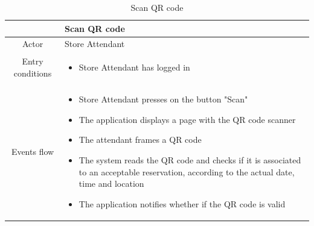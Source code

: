 \documentclass[table, 12pt]{article}
\begin{document}
\begin{longtable}{|c| p{10cm}|}
    \caption{Scan QR code}                                                                                                                                                                                                                                                                \\
    \hline
                     & Scan QR code                                                                                                                                                                                                                                                       \\
    \hline
    Actor            & Store Attendant                                                                                                                                                                                                                                                    \\
    \hline
    Entry conditions & \begin{itemize}
        \item Store Attendant has logged in
    \end{itemize}                                                                                                                                                                                                                                         \\
    \hline
    Events flow      & \begin{itemize}[nosep,after=\strut]
        \item Store Attendant presses on the button "Scan"
        \item The application displays a page with the QR code scanner
        \item The attendant frames a QR code
        \item The system reads the QR code and checks if it is associated to an acceptable reservation, according to the actual date, time and location
        \item The application notifies whether if the QR code is valid
    \end{itemize}                                                                                                                                                                                                                                         \\

\end{longtable}
\end{document}
